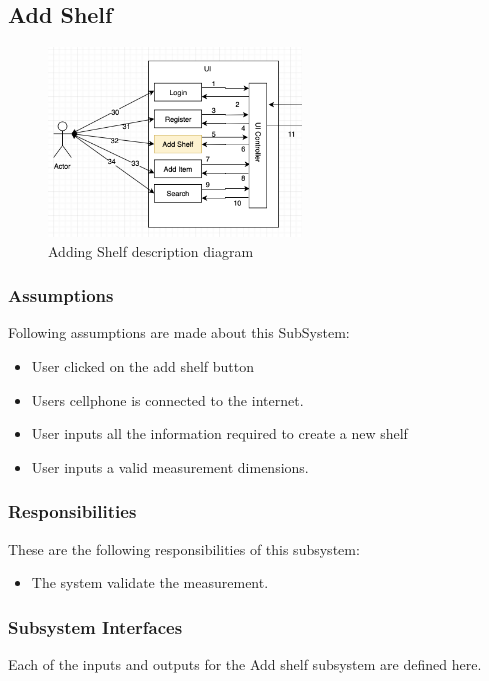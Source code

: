 \subsection{Add Shelf}


\begin{figure}[h!]
	\centering
 	\includegraphics[width=0.60\textwidth]{images/addshelf}
 \caption{Adding Shelf description diagram}
\end{figure}

\subsubsection{Assumptions}
Following assumptions are made about this SubSystem:
\begin{itemize}
    \item User clicked on the add shelf button
    \item Users cellphone is connected to the internet.
    \item User inputs all the information required to create a new shelf
    \item User inputs a valid measurement dimensions.
\end{itemize}

\subsubsection{Responsibilities}
These are the following responsibilities of this subsystem:
\begin{itemize}
    \item The system validate the measurement.
\end{itemize}

\subsubsection{Subsystem Interfaces}
Each of the inputs and outputs for the Add shelf subsystem are defined here.

